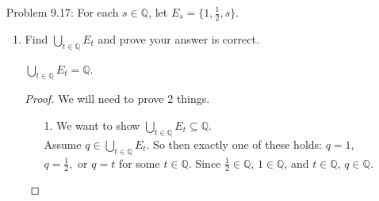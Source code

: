 \documentclass{article}
\theoremstyle{claim}
\theoremstyle{definition}
\begin{document}
\begin{enumerate}
\begin{proof}
\begin{enumerate}
                \item[2.] $\bigcap\limits_{n \in \mathbb{N}} (0, 1 + \frac{1}{n}) \supseteq (0, 1]$.\\
                    Assume $x \in (0, 1]$. Then $0 < x \le 1$. Then $\forall n \in \mathbb{N}$, $0 < x < 1 + \frac{1}{n}$. This means $x \in \bigcap\limits_{n \in \mathbb{N}} (0, 1 + \frac{1}{n})$.
            \end{enumerate}
            So $\bigcap\limits_{n \in \mathbb{N}} (0, \frac{n+1}{n}) = (0, 1]$.
        \end{proof}
    \item[Problem 9.17:] For each $s \in \mathbb{Q}$, let $E_s = \{ 1, \frac{1}{2}, s \}$.
    \begin{enumerate}
        \item Find $\bigcup\limits_{t \in \mathbb{Q}} E_t$ and prove your answer is correct.
        \item[] $\bigcup\limits_{t \in \mathbb{Q}} E_t = \mathbb{Q}$.
            \begin{proof}
                We will need to prove 2 things.
                \begin{enumerate}
                    \item[1.] We want to show $\bigcup\limits_{t \in \mathbb{Q}} E_t \subseteq \mathbb{Q}$.\\
                        Assume $q \in \bigcup\limits_{t \in \mathbb{Q}} E_t$. So then exactly one of these holds: $q = 1$, $q = \frac{1}{2}, \text{ or } q = t$ for some $t \in \mathbb{Q}$. Since $\frac{1}{2} \in \mathbb{Q}$, $1 \in \mathbb{Q}$, and $t \in \mathbb{Q}$, $q \in \mathbb{Q}$. 


\end{enumerate}
\end{proof}
\end{enumerate}
\end{enumerate}
\end{document}

